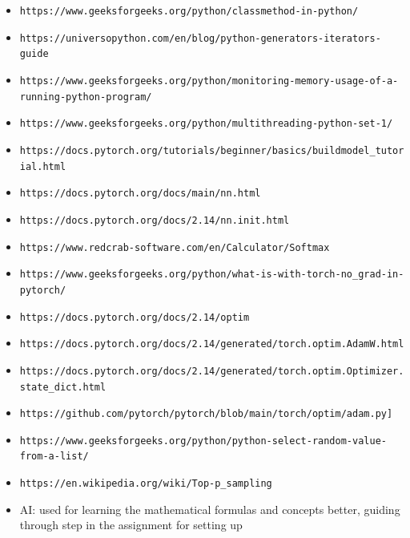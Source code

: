 \documentclass[11pt,a4paper]{article}
\begin{document}
\begin{itemize}
References:
\item \nolinkurl{https://www.geeksforgeeks.org/python/classmethod-in-python/}
\item \nolinkurl{https://universopython.com/en/blog/python-generators-iterators-guide}
\item \nolinkurl{https://www.geeksforgeeks.org/python/monitoring-memory-usage-of-a-running-python-program/}
\item \nolinkurl{https://www.geeksforgeeks.org/python/multithreading-python-set-1/}
\item \nolinkurl{https://docs.pytorch.org/tutorials/beginner/basics/buildmodel_tutorial.html}
\item \nolinkurl{https://docs.pytorch.org/docs/main/nn.html}
\item \nolinkurl{https://docs.pytorch.org/docs/2.14/nn.init.html}
\item \nolinkurl{https://www.redcrab-software.com/en/Calculator/Softmax}
\item \nolinkurl{https://www.geeksforgeeks.org/python/what-is-with-torch-no_grad-in-pytorch/}
\item \nolinkurl{https://docs.pytorch.org/docs/2.14/optim}
\item \nolinkurl{https://docs.pytorch.org/docs/2.14/generated/torch.optim.AdamW.html}
\item \nolinkurl{https://docs.pytorch.org/docs/2.14/generated/torch.optim.Optimizer.state_dict.html}
\item \nolinkurl{https://github.com/pytorch/pytorch/blob/main/torch/optim/adam.py]}
\item \nolinkurl{https://www.geeksforgeeks.org/python/python-select-random-value-from-a-list/}
\item \nolinkurl{https://en.wikipedia.org/wiki/Top-p_sampling}
\item AI: used for learning the mathematical formulas and concepts better, guiding through step in the assignment for setting up
\end{itemize}
\end{document}
